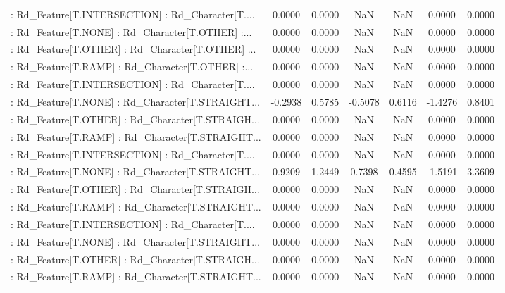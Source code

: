 \begin{longtable}{p{4cm}cccccc}
 : Rd\_Feature[T.INTERSECTION] : Rd\_Character[T.... &  0.0000 &    0.0000 &     NaN &          NaN &  0.0000 &  0.0000 \\
 : Rd\_Feature[T.NONE] : Rd\_Character[T.OTHER] :... &  0.0000 &    0.0000 &     NaN &          NaN &  0.0000 &  0.0000 \\
 : Rd\_Feature[T.OTHER] : Rd\_Character[T.OTHER] ... &  0.0000 &    0.0000 &     NaN &          NaN &  0.0000 &  0.0000 \\
 : Rd\_Feature[T.RAMP] : Rd\_Character[T.OTHER] :... &  0.0000 &    0.0000 &     NaN &          NaN &  0.0000 &  0.0000 \\
 : Rd\_Feature[T.INTERSECTION] : Rd\_Character[T.... &  0.0000 &    0.0000 &     NaN &          NaN &  0.0000 &  0.0000 \\
 : Rd\_Feature[T.NONE] : Rd\_Character[T.STRAIGHT... & -0.2938 &    0.5785 & -0.5078 &       0.6116 & -1.4276 &  0.8401 \\
 : Rd\_Feature[T.OTHER] : Rd\_Character[T.STRAIGH... &  0.0000 &    0.0000 &     NaN &          NaN &  0.0000 &  0.0000 \\
 : Rd\_Feature[T.RAMP] : Rd\_Character[T.STRAIGHT... &  0.0000 &    0.0000 &     NaN &          NaN &  0.0000 &  0.0000 \\
 : Rd\_Feature[T.INTERSECTION] : Rd\_Character[T.... &  0.0000 &    0.0000 &     NaN &          NaN &  0.0000 &  0.0000 \\
 : Rd\_Feature[T.NONE] : Rd\_Character[T.STRAIGHT... &  0.9209 &    1.2449 &  0.7398 &       0.4595 & -1.5191 &  3.3609 \\
 : Rd\_Feature[T.OTHER] : Rd\_Character[T.STRAIGH... &  0.0000 &    0.0000 &     NaN &          NaN &  0.0000 &  0.0000 \\
 : Rd\_Feature[T.RAMP] : Rd\_Character[T.STRAIGHT... &  0.0000 &    0.0000 &     NaN &          NaN &  0.0000 &  0.0000 \\
 : Rd\_Feature[T.INTERSECTION] : Rd\_Character[T.... &  0.0000 &    0.0000 &     NaN &          NaN &  0.0000 &  0.0000 \\
 : Rd\_Feature[T.NONE] : Rd\_Character[T.STRAIGHT... &  0.0000 &    0.0000 &     NaN &          NaN &  0.0000 &  0.0000 \\
 : Rd\_Feature[T.OTHER] : Rd\_Character[T.STRAIGH... &  0.0000 &    0.0000 &     NaN &          NaN &  0.0000 &  0.0000 \\
 : Rd\_Feature[T.RAMP] : Rd\_Character[T.STRAIGHT... &  0.0000 &    0.0000 &     NaN &          NaN &  0.0000 &  0.0000 \\

\end{longtable}
